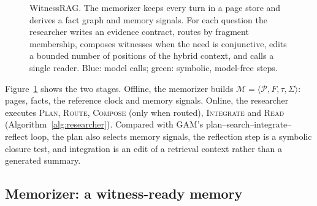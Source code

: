 \begin{figure}[t]
{}
\caption{WitnessRAG. The memorizer keeps every turn in a page store and
derives a fact graph and memory signals. For each question the researcher
writes an evidence contract, routes by fragment membership, composes
witnesses when the need is conjunctive, edits a bounded number of positions of
the hybrid context, and calls a single reader. Blue: model calls; green:
symbolic, model-free steps.}
\label{fig:overview}
\end{figure}

Figure~\ref{fig:overview} shows the two stages. Offline, the memorizer builds
$\mathcal{M}=\langle\mathcal{P},F,\tau,\Sigma\rangle$: pages, facts, the
reference clock and memory signals. Online, the researcher executes
\textsc{Plan}, \textsc{Route}, \textsc{Compose} (only when routed),
\textsc{Integrate} and \textsc{Read} (Algorithm~\ref{alg:researcher}).
Compared with GAM's plan--search--integrate--reflect loop, the plan also
selects memory signals, the reflection step is a symbolic closure test, and
integration is an edit of a retrieval context rather than a generated summary.

\subsection{Memorizer: a witness-ready memory}\label{sec:memorizer}


